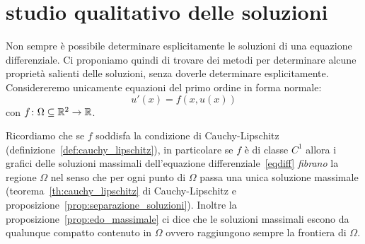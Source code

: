 \section{studio qualitativo delle soluzioni}

Non sempre è possibile determinare esplicitamente le soluzioni
di una equazione differenziale.
Ci proponiamo quindi di trovare dei metodi per
determinare alcune proprietà salienti delle soluzioni, senza
doverle determinare esplicitamente.
Considereremo unicamente equazioni del primo ordine in forma normale:
\begin{equation}\label{eqdiff}
	u'(x)= f(x,u(x))
\end{equation}
con $f\colon \Omega \subseteq \mathbb R^2\to \mathbb R$.

Ricordiamo che se $f$ soddisfa la condizione di Cauchy-Lipschitz
(definizione~\ref{def:cauchy_lipschitz}), in particolare
se $f$ è di classe $C^1$ allora i grafici delle soluzioni
massimali dell'equazione differenziale~\eqref{eqdiff}
\emph{fibrano} la regione $\Omega$ nel senso che per ogni punto di
$\Omega$ passa una unica soluzione massimale (teorema~\ref{th:cauchy_lipschitz}
di Cauchy-Lipschitz e proposizione~\ref{prop:separazione_soluzioni}).
Inoltre la proposizione~\ref{prop:edo_massimale} ci dice
che le soluzioni massimali escono da qualunque compatto contenuto in
$\Omega$ ovvero raggiungono sempre la frontiera di $\Omega$.

